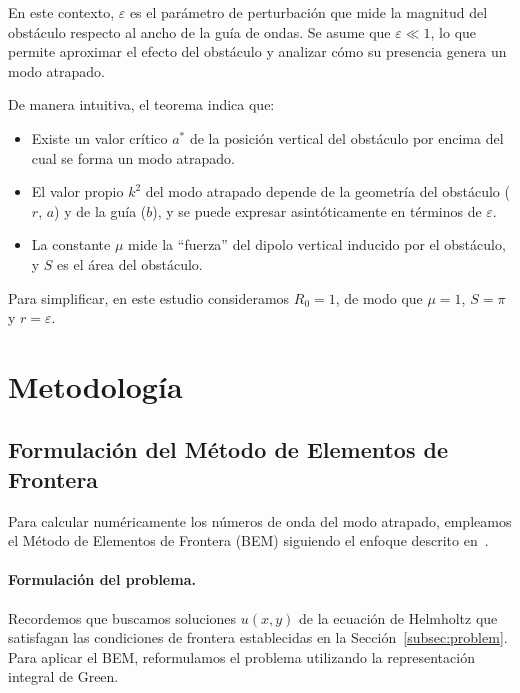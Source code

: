 \documentclass[11pt]{article}
\begin{document}
En este contexto, \(\varepsilon\) es el parámetro de perturbación que mide la magnitud del obstáculo respecto al ancho de la guía de ondas. Se asume que \(\varepsilon \ll 1\), lo que permite aproximar el efecto del obstáculo y analizar cómo su presencia genera un modo atrapado.  

De manera intuitiva, el teorema indica que:
\begin{itemize}
    \item Existe un valor crítico \(a^*\) de la posición vertical del obstáculo por encima del cual se forma un modo atrapado.
    \item El valor propio \(k^2\) del modo atrapado depende de la geometría del obstáculo (\(r\), \(a\)) y de la guía (\(b\)), y se puede expresar asintóticamente en términos de \(\varepsilon\).
    \item La constante \(\mu\) mide la ``fuerza'' del dipolo vertical inducido por el obstáculo, y \(S\) es el área del obstáculo.
\end{itemize}

Para simplificar, en este estudio consideramos \(R_0 = 1\), de modo que \(\mu = 1\), \(S = \pi\) y \(r = \varepsilon\).

\section{Metodología}

\subsection{Formulación del Método de Elementos de Frontera} \label{sub:formulation}

Para calcular numéricamente los números de onda del modo atrapado, empleamos el Método de Elementos de Frontera (BEM) siguiendo el enfoque descrito en~\cite{Linton1992}. 

\paragraph{Formulación del problema.} Recordemos que buscamos soluciones $u(x,y)$ de la ecuación de Helmholtz que satisfagan las condiciones de frontera establecidas en la Sección~\ref{subsec:problem}. Para aplicar el BEM, reformulamos el problema utilizando la representación integral de Green.
\end{document}
